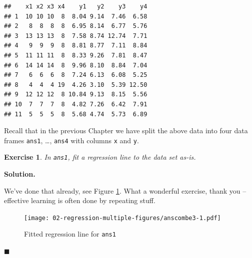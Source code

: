 \documentclass[10pt,b5paper,krantz1]{krantz}
\newenvironment{Shaded}{\begin{snugshade}}{\end{snugshade}}
\newcommand{\DataTypeTok}[1]{\textcolor[rgb]{0.27,0.27,0.27}{#1}}
\newcommand{\KeywordTok}[1]{\textcolor[rgb]{0.27,0.27,0.27}{\textbf{#1}}}
\newcommand{\NormalTok}[1]{#1}
\newcommand{\OperatorTok}[1]{\textcolor[rgb]{0.43,0.43,0.43}{\textbf{#1}}}
\newcommand{\StringTok}[1]{\textcolor[rgb]{0.5,0.5,0.5}{#1}}
\newtheorem{exercise}{Exercise}[chapter]
\newenvironment{solution}{%
\bigskip\noindent\textbf{Solution. }%
\it\ignorespaces%
\ignorespaces%
}{\ignorespaces%
\hfill$\blacksquare$%
}
\begin{document}
\begin{verbatim}
##    x1 x2 x3 x4    y1   y2    y3    y4
## 1  10 10 10  8  8.04 9.14  7.46  6.58
## 2   8  8  8  8  6.95 8.14  6.77  5.76
## 3  13 13 13  8  7.58 8.74 12.74  7.71
## 4   9  9  9  8  8.81 8.77  7.11  8.84
## 5  11 11 11  8  8.33 9.26  7.81  8.47
## 6  14 14 14  8  9.96 8.10  8.84  7.04
## 7   6  6  6  8  7.24 6.13  6.08  5.25
## 8   4  4  4 19  4.26 3.10  5.39 12.50
## 9  12 12 12  8 10.84 9.13  8.15  5.56
## 10  7  7  7  8  4.82 7.26  6.42  7.91
## 11  5  5  5  8  5.68 4.74  5.73  6.89
\end{verbatim}

Recall that in the previous Chapter we have
split the above data into four data frames
\texttt{ans1}, \ldots{}, \texttt{ans4} with columns \texttt{x} and \texttt{y}.

\begin{exercise}

In \texttt{ans1}, fit a regression line to the data set as-is.

\end{exercise}

\begin{solution}

We've done that already, see Figure \ref{fig:anscombe3}.
What a wonderful exercise, thank you -- effective
learning is often done by repeating stuff.

\begin{Shaded}
\end{Shaded}

\begin{figure}
\hypertarget{fig:anscombe3}{%
\centering
\texttt{[image: 02-regression-multiple-figures/anscombe3-1.pdf]}
\caption{Fitted regression line for \texttt{ans1}}\label{fig:anscombe3}
}
\end{figure}

\end{solution}
\end{document}
